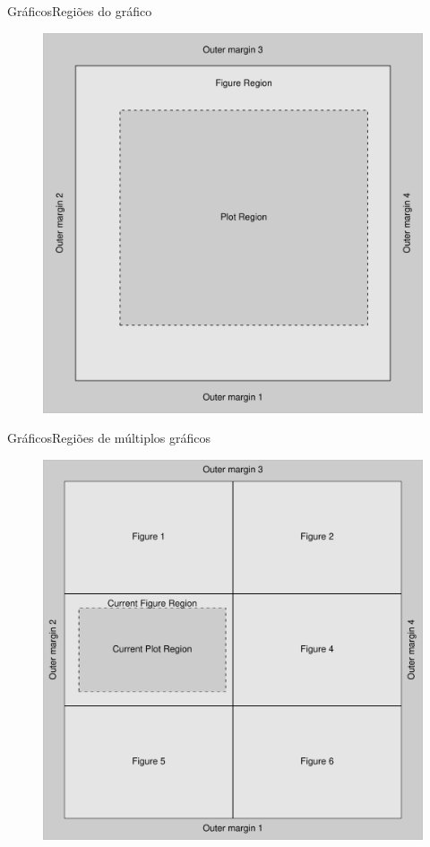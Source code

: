 \documentclass[10pt]{beamer}\usepackage[]{graphicx}\usepackage[]{color}
\begin{document}
\begin{frame}[fragile]{Gráficos}{Regiões do gráfico}
\begin{figure}[htp]
\centering
\includegraphics[height=0.95\textheight]{figure/fig1m}
\end{figure}
\end{frame}

\begin{frame}[fragile]{Gráficos}{Regiões de múltiplos
    gráficos}
\begin{figure}[htp]
\centering
\includegraphics[height=0.95\textheight]{figure/fig2m}
\end{figure}
\end{frame}
\end{document}
